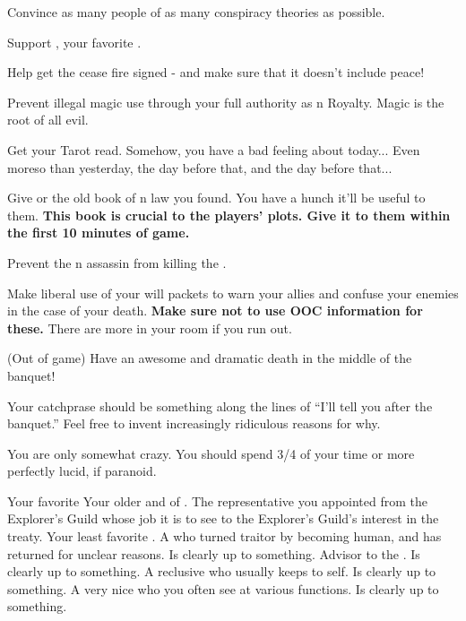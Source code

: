 \documentclass[char]{NeptuneBall}
\begin{document}
\begin{itemz}[Goals]
  \item Convince as many people of as many conspiracy theories as possible.
  \item Support \cPrincess{}, your favorite \cPrincess{\nephew}.
  \item Help \cKing{} get the cease fire signed - and make sure that it doesn't include peace!
	\item Prevent illegal magic use through your full authority as \pAtlantis{}n Royalty. Magic is the root of all evil.
	\item Get your Tarot read. Somehow, you have a bad feeling about today... Even moreso than yesterday, the day before that, and the day before that...
	\item Give \cPrincess{} or \cDiplomat{} the old book of \pPacifica{}n law you found. You have a hunch it'll be useful to them. {\bf This book is crucial to the players' plots. Give it to them within the first 10 minutes of game.}
	\item Prevent the \pPacifica{}n assassin from killing the \cKing{\King}.
	\item Make liberal use of your will packets to warn your allies and confuse your enemies in the case of your death. {\bf Make sure not to use OOC information for these.} There are more in your room if you run out.
	\item (Out of game) Have an awesome and dramatic death in the middle of the banquet!
\end{itemz}

\begin{itemz}[Notes]
  \item Your catchprase should be something along the lines of ``I'll tell you after the banquet.'' Feel free to invent increasingly ridiculous reasons for why.
  \item You are only somewhat crazy. You should spend 3/4 of your time or more perfectly lucid, if paranoid.
\end{itemz}

\begin{contacts}
  \contact{\cPrincess{}} Your favorite \cPrincess{\nephew}
  \contact{\cKing{}} Your older \cKing{\sibling} and \cKing{\King} of \pAtlantis{}.
  \contact{\cPriest{}} The representative you appointed from the Explorer's Guild whose job it is to see to the Explorer's Guild's interest in the treaty.
	\contact{\cAriel{}} Your least favorite \cAriel{\nephew}. A \cAriel{\mer} who turned traitor by becoming human, and has returned for unclear reasons. Is clearly up to something.
	\contact{\cManta{}} Advisor to the \cKing{\King}. Is clearly up to something.
	\contact{\cQueen{}} A reclusive \cQueen{\mer} who usually keeps to \cQueen{\their}self. Is clearly up to something.
	\contact{\cWitch{}} A very nice \cWitch{\mer} who you often see at various functions. Is clearly up to something.
\end{contacts}
\end{document}
